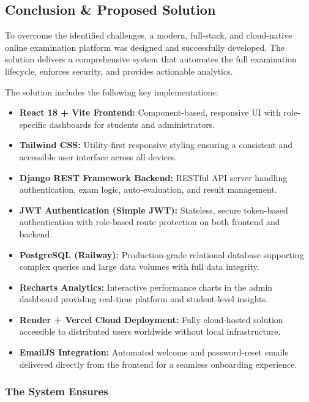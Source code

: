 \documentclass[12pt,a4paper]{article}
\begin{document}
\subsection{Conclusion \& Proposed Solution}

To overcome the identified challenges, a modern, full-stack, and cloud-native online examination platform was designed and successfully developed. The solution delivers a comprehensive system that automates the full examination lifecycle, enforces security, and provides actionable analytics.

The solution includes the following key implementations:

\begin{itemize}[leftmargin=1.5em]
  \item[(a)] \textbf{React 18 + Vite Frontend:} Component-based, responsive UI with role-specific dashboards for students and administrators.
  \item[(b)] \textbf{Tailwind CSS:} Utility-first responsive styling ensuring a consistent and accessible user interface across all devices.
  \item[(c)] \textbf{Django REST Framework Backend:} RESTful API server handling authentication, exam logic, auto-evaluation, and result management.
  \item[(d)] \textbf{JWT Authentication (Simple JWT):} Stateless, secure token-based authentication with role-based route protection on both frontend and backend.
  \item[(e)] \textbf{PostgreSQL (Railway):} Production-grade relational database supporting complex queries and large data volumes with full data integrity.
  \item[(f)] \textbf{Recharts Analytics:} Interactive performance charts in the admin dashboard providing real-time platform and student-level insights.
  \item[(g)] \textbf{Render + Vercel Cloud Deployment:} Fully cloud-hosted solution accessible to distributed users worldwide without local infrastructure.
  \item[(h)] \textbf{EmailJS Integration:} Automated welcome and password-reset emails delivered directly from the frontend for a seamless onboarding experience.
\end{itemize}

\subsubsection{The System Ensures}
\end{document}
